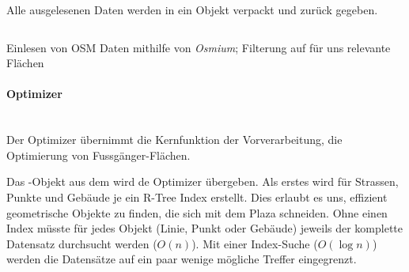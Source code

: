 Alle ausgelesenen Daten werden in ein  Objekt verpackt und zurück gegeben.

\begin{listing}[ht]
    \inputminted{python}{projectdoc/listing/osmium_handler.py}
    \caption[Einlesen OSM-Daten mit Osmium]{Einlesen von OSM Daten mithilfe von \emph{Osmium}; Filterung auf für uns relevante Flächen}
    \label{osmium_import_code}
\end{listing}

\paragraph{Optimizer}\label{impl:Optimizer}~\\
Der Optimizer übernimmt die Kernfunktion der Vorverarbeitung, die Optimierung von Fussgänger-Flächen.

Das -Objekt aus dem  wird de Optimizer übergeben. Als erstes wird für Strassen, Punkte und Gebäude je ein R-Tree \cite{rtree_Guttman} Index erstellt. Dies erlaubt es uns, effizient geometrische Objekte zu finden, die sich mit dem Plaza schneiden. Ohne einen Index müsste für jedes Objekt (Linie, Punkt oder Gebäude) jeweils der komplette Datensatz durchsucht werden ($O(n)$). Mit einer Index-Suche ($O(\log n)$) werden die Datensätze auf ein paar wenige mögliche Treffer eingegrenzt.


